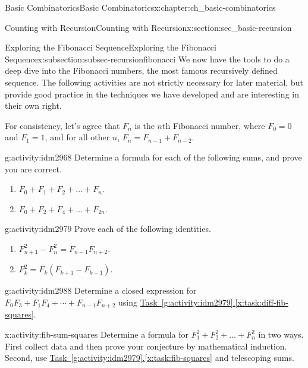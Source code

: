 \documentclass[oneside,10pt,]{book}
\numberwithin{equation}{chapter}
\begin{document}
\begin{chapterptx}{Basic Combinatorics}{}{Basic Combinatorics}{}{}{x:chapter:ch_basic-combinatorics}
\begin{sectionptx}{Counting with Recursion}{}{Counting with Recursion}{}{}{x:section:sec_basic-recursion}
\typeout{************************************************}
%
\begin{subsectionptx}{Exploring the Fibonacci Sequence}{}{Exploring the Fibonacci Sequence}{}{}{x:subsection:subsec-recursionfibonacci}
We now have the tools to do a deep dive into the Fibonacci numbers, the most famous recursively defined sequence.  The following activities are not strictly necessary for later material, but provide good practice in the techniques we have developed and are interesting in their own right.%
\par
For consistency, let's agree that \(F_n\) is the \(n\)th Fibonacci number, where \(F_0 = 0\) and \(F_1 = 1\), and for all other \(n\), \(F_n = F_{n-1} + F_{n-2}\).%
\begin{activity}{}{g:activity:idm2968}%
Determine a formula for each of the following sums, and prove you are correct.%
\begin{enumerate}[font=\bfseries,label=(\alph*),ref=\alph*]
\item{}\(F_{0} + F_{1} + F_{2} + \ldots + F_{n}\).%
\item{}\(F_{0} + F_{2} + F_{4} + \ldots + F_{2n}\).%
\end{enumerate}
\end{activity}
\begin{activity}{}{g:activity:idm2979}%
Prove each of the following identities.%
\begin{enumerate}[font=\bfseries,label=(\alph*),ref=\alph*]
\item\label{x:task:diff-fib-squares}\(F_{n + 1}^{2} - F_{n}^{2} = F_{n - 1}F_{n + 2}\).%
\item\label{x:task:fib-squares}\(F_{k}^{2} = F_{k}(F_{k + 1} - F_{k - 1})\).%
\end{enumerate}
\end{activity}
\begin{activity}{}{g:activity:idm2988}%
Determine a closed expression for \(F_{0}F_{3}
+ F_{1}F_{4} + \cdots +
F_{n-1}F_{n+2}\) using \hyperref[x:task:diff-fib-squares]{Task~\ref{g:activity:idm2979}.\ref{x:task:diff-fib-squares}}.%
\end{activity}
\begin{activity}{}{x:activity:fib-sum-squares}%
Determine a formula for \(F_{1}^{2} + F_{2}^{2} + \ldots + F_{n}^{2}\) in two ways.  First collect data and then prove your conjecture by mathematical induction.  Second, use \hyperref[x:task:fib-squares]{Task~\ref{g:activity:idm2979}.\ref{x:task:fib-squares}} and telescoping sums.%

\end{activity}
\end{subsectionptx}
\end{sectionptx}
\end{chapterptx}
\end{document}
